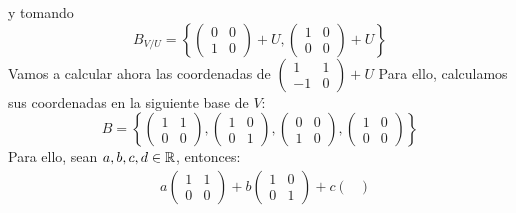 \documentclass[12pt]{article}
\begin{document}
\begin{enumerate}
\begin{enumerate}
		            y tomando
		            \begin{equation*}
			            B_{V/U} = \left\{ \begin{pmatrix}
				            0 & 0 \\
				            1 & 0
			            \end{pmatrix}+ U,\begin{pmatrix}
				            1 & 0 \\
				            0 & 0
			            \end{pmatrix}+ U
			            \right\}
		            \end{equation*}
		            Vamos a calcular ahora las coordenadas de $\begin{pmatrix}
				            1  & 1 \\
				            -1 & 0
			            \end{pmatrix} + U$
		            Para ello, calculamos sus coordenadas en la siguiente base de $V$:
		            \begin{equation*}
			            B = \left\{ \begin{pmatrix}
				            1 & 1 \\
				            0 & 0
			            \end{pmatrix}, \begin{pmatrix}
				            1 & 0 \\
				            0 & 1
			            \end{pmatrix}, \begin{pmatrix}
				            0 & 0 \\
				            1 & 0
			            \end{pmatrix},\begin{pmatrix}
				            1 & 0 \\
				            0 & 0
			            \end{pmatrix} \right\}
		            \end{equation*}
		            Para ello, sean $a,b,c,d \in {\mathbb{R}}$, entonces:
		            \begin{align*}
			             & a\begin{pmatrix}
				                1 & 1 \\
				                0 & 0
			                \end{pmatrix}+ b\begin{pmatrix}
				                                1 & 0 \\
				                                0 & 1
			                                \end{pmatrix}+ c\begin{pmatrix}

\end{pmatrix}
\end{align*}
\end{enumerate}
\end{enumerate}
\end{document}
